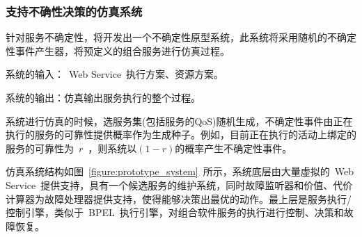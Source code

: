 %
%
%
%
%
%
%
%
%
%
%
%
%

\subsubsection{支持不确性决策的仿真系统}

针对服务不确定性，将开发出一个不确定性原型系统，此系统将采用随机的不确定性事件产生器，将预定义的组合服务进行仿真过程。

系统的输入：~Web Service~执行方案、资源方案。

系统的输出：仿真输出服务执行的整个过程。

系统进行仿真的时候，选服务集(包括服务的QoS)随机生成，不确定性事件由正在执行的服务的可靠性提供概率作为生成种子。例如，目前正在执行的活动上绑定的服务的可靠性为~$r$~，则系统以$(1-r)$的概率产生不确定性事件。

仿真系统结构如图~\ref{figure:prototype_system}~所示，系统底层由大量虚拟的~Web Service~提供支持，具有一个候选服务的维护系统，同时故障监听器和价值、代价计算器为故障处理器提供支持，使得能够决策出最优的动作。最上层是服务执行/控制引擎，类似于~BPEL~执行引擎，对组合软件服务的执行进行控制、决策和故障恢复。

